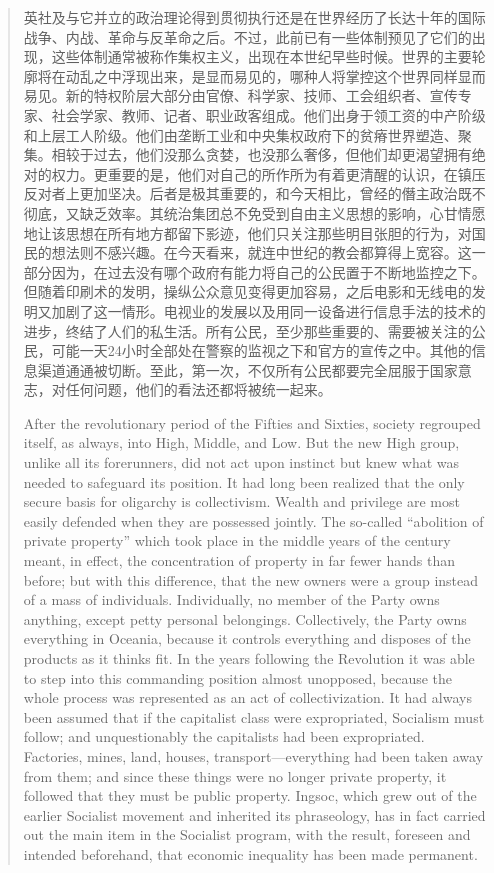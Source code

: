 \begin{paracol}{2}
\begin{quotation}
英社及与它并立的政治理论得到贯彻执行还是在世界经历了长达十年的国际战争、内战、革命与反革命之后。不过，此前已有一些体制预见了它们的出现，这些体制通常被称作集权主义，出现在本世纪早些时候。世界的主要轮廓将在动乱之中浮现出来，是显而易见的，哪种人将掌控这个世界同样显而易见。新的特权阶层大部分由官僚、科学家、技师、工会组织者、宣传专家、社会学家、教师、记者、职业政客组成。他们出身于领工资的中产阶级和上层工人阶级。他们由垄断工业和中央集权政府下的贫瘠世界塑造、聚集。相较于过去，他们没那么贪婪，也没那么奢侈，但他们却更渴望拥有绝对的权力。更重要的是，他们对自己的所作所为有着更清醒的认识，在镇压反对者上更加坚决。后者是极其重要的，和今天相比，曾经的僭主政治既不彻底，又缺乏效率。其统治集团总不免受到自由主义思想的影响，心甘情愿地让该思想在所有地方都留下影迹，他们只关注那些明目张胆的行为，对国民的想法则不感兴趣。在今天看来，就连中世纪的教会都算得上宽容。这一部分因为，在过去没有哪个政府有能力将自己的公民置于不断地监控之下。但随着印刷术的发明，操纵公众意见变得更加容易，之后电影和无线电的发明又加剧了这一情形。电视业的发展以及用同一设备进行信息手法的技术的进步，终结了人们的私生活。所有公民，至少那些重要的、需要被关注的公民，可能一天24小时全部处在警察的监视之下和官方的宣传之中。其他的信息渠道通通被切断。至此，第一次，不仅所有公民都要完全屈服于国家意志，对任何问题，他们的看法还都将被统一起来。

\switchcolumn*

After the revolutionary period of the Fifties and Sixties, society
regrouped itself, as always, into High, Middle, and Low. But the new
High group, unlike all its forerunners, did not act upon instinct but
knew what was needed to safeguard its position. It had long been
realized that the only secure basis for oligarchy is collectivism.
Wealth and privilege are most easily defended when they are possessed
jointly. The so-called ``abolition of private property'' which took place
in the middle years of the century meant, in effect, the concentration
of property in far fewer hands than before; but with this difference,
that the new owners were a group instead of a mass of individuals.
Individually, no member of the Party owns anything, except petty
personal belongings. Collectively, the Party owns everything in Oceania,
because it controls everything and disposes of the products as it thinks
fit. In the years following the Revolution it was able to step into this
commanding position almost unopposed, because the whole process was
represented as an act of collectivization. It had always been assumed
that if the capitalist class were expropriated, Socialism must follow;
and unquestionably the capitalists had been expropriated. Factories,
mines, land, houses, transport---everything had been taken away from
them; and since these things were no longer private property, it
followed that they must be public property. Ingsoc, which grew out of
the earlier Socialist movement and inherited its phraseology, has in
fact carried out the main item in the Socialist program, with the
result, foreseen and intended beforehand, that economic inequality has
been made permanent.


\end{quotation}
\end{paracol}
